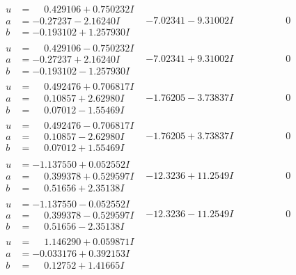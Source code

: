 \documentclass[1p]{elsarticle_modified}
\theoremstyle{definition}
\begin{document}
$$\begin{array}{c|c|c}
\begin{aligned}
u &= \phantom{-}0.429106 + 0.750232 I \\
a &= -0.27237 - 2.16240 I \\
b &= -0.193102 + 1.257930 I\end{aligned}
 & -7.02341 - 9.31002 I & \phantom{-0.000000 } 0 \\ \hline\begin{aligned}
u &= \phantom{-}0.429106 - 0.750232 I \\
a &= -0.27237 + 2.16240 I \\
b &= -0.193102 - 1.257930 I\end{aligned}
 & -7.02341 + 9.31002 I & \phantom{-0.000000 } 0 \\ \hline\begin{aligned}
u &= \phantom{-}0.492476 + 0.706817 I \\
a &= \phantom{-}0.10857 + 2.62980 I \\
b &= \phantom{-}0.07012 - 1.55469 I\end{aligned}
 & -1.76205 - 3.73837 I & \phantom{-0.000000 } 0 \\ \hline\begin{aligned}
u &= \phantom{-}0.492476 - 0.706817 I \\
a &= \phantom{-}0.10857 - 2.62980 I \\
b &= \phantom{-}0.07012 + 1.55469 I\end{aligned}
 & -1.76205 + 3.73837 I & \phantom{-0.000000 } 0 \\ \hline\begin{aligned}
u &= -1.137550 + 0.052552 I \\
a &= \phantom{-}0.399378 + 0.529597 I \\
b &= \phantom{-}0.51656 + 2.35138 I\end{aligned}
 & -12.3236 + 11.2549 I & \phantom{-0.000000 } 0 \\ \hline\begin{aligned}
u &= -1.137550 - 0.052552 I \\
a &= \phantom{-}0.399378 - 0.529597 I \\
b &= \phantom{-}0.51656 - 2.35138 I\end{aligned}
 & -12.3236 - 11.2549 I & \phantom{-0.000000 } 0 \\ \hline\begin{aligned}
u &= \phantom{-}1.146290 + 0.059871 I \\
a &= -0.033176 + 0.392153 I \\
b &= \phantom{-}0.12752 + 1.41665 I\end{aligned}

\end{array}$$
\end{document}
